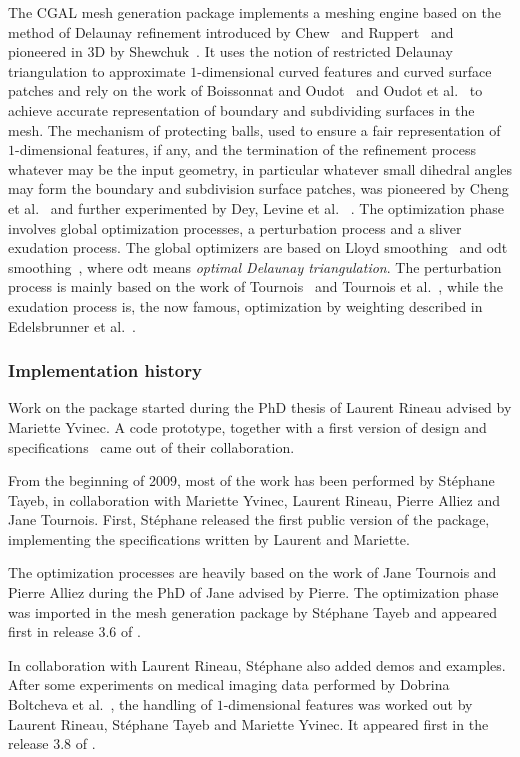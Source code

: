 The CGAL mesh generation package implements a  meshing engine based 
on the method of   Delaunay refinement introduced by Chew~\cite{c-gqmgc-93}  and Ruppert~\cite{r-draq2d-95}
and pioneered in 3D by Shewchuk~\cite{s-tmgdr-98}. 
It uses the notion of restricted Delaunay triangulation
 to approximate $1$-dimensional curved features and  curved surface patches
and rely on the work of Boissonnat and Oudot~\cite{cgal:bo-pgsms-05}
and Oudot et al.~\cite{cgal:ory-mvbss-05}
to achieve accurate representation of boundary and subdividing surfaces in the mesh.
The mechanism of protecting balls, used to ensure a fair representation
of $1$-dimensional features, if any, and the termination of the refinement process
whatever may be the input geometry, in particular whatever small dihedral angles may form
the boundary and subdivision surface patches,
was pioneered by Cheng et al.~\cite{cgal:cdr-drpsc-07} and further experimented by Dey, Levine et al.
~\cite{cgal:cdl-pdma-07}.
The optimization phase involves global optimization processes, a perturbation process
and a sliver exudation process. The global optimizers are based on Lloyd smoothing~\cite{cgal:dfg-cvtaa-99t, cgal:dw-tmgob-02}
and odt smoothing~\cite{cgal::c-mssbo-04,cgal:acyd-vtm-05}, where odt means
\emph{optimal Delaunay triangulation}. The perturbation process 
is mainly based on the work of Tournois~\cite{cgal:t-om-09}
and Tournois et al.~\cite{cgal:twad-iropitmg-09},
while the exudation process is, the now famous,  optimization by weighting described
in Edelsbrunner et al.~\cite{cgal:cdeft-slive-00}.


\subsubsection{Implementation history}
Work on the package  started during the PhD thesis of Laurent Rineau
advised by Mariette Yvinec.  A  code prototype, together
with a first version of design and specifications~\cite{cgal:ry-gsddrm-06}
came out of their collaboration.

From the beginning of 2009, most of the work has been performed by St\'ephane
Tayeb, in collaboration with Mariette Yvinec, Laurent Rineau, Pierre Alliez and Jane Tournois.
First, St\'ephane released the first public version of the package, implementing the specifications
written by Laurent and Mariette. 

The optimization processes are
heavily based on the work of Jane Tournois and Pierre Alliez
during the PhD of Jane advised by Pierre. The optimization phase was imported
in the mesh generation package by St\'ephane Tayeb
and appeared first in  release 3.6 of \cgal.

In collaboration with Laurent Rineau, St\'ephane also added demos and examples.
After some experiments on medical imaging data performed by
Dobrina Boltcheva et al.~\cite{cgal:byb-mgmmi-09, cgal:-byb-fpdmgmmi-09}, the handling
of $1$-dimensional features was worked out by Laurent Rineau, St\'ephane Tayeb
and Mariette Yvinec. It appeared first in the release 3.8  of \cgal.
 



